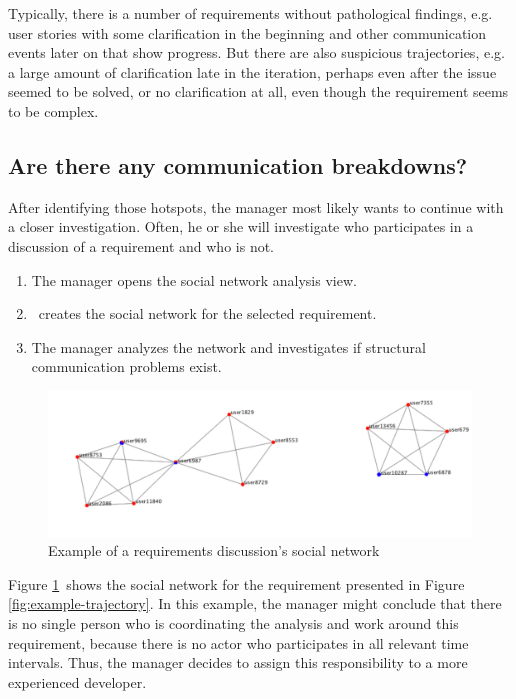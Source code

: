 Typically, there is a number of requirements without pathological findings, e.g. user stories with some clarification in the beginning and other communication events later on that show progress. 
But there are also suspicious trajectories, e.g. a large amount of clarification late in the iteration, perhaps even after the issue seemed to be solved, or no clarification at all, even though the requirement seems to be complex.

\subsection{Are there any communication breakdowns?}
After identifying those hotspots, the manager most likely wants to continue with a closer investigation. 
Often, he or she will investigate who participates in a discussion of a requirement and who is not.
\begin{enumerate}
\item The manager opens the social network analysis view.
\item \viss\ creates the social network for the selected requirement.
\item The manager analyzes the network and investigates if structural communication problems exist.
\end{enumerate}

\begin{figure}
\includegraphics[width=\columnwidth]{img/example-sn}
\caption{Example of a requirements discussion's social network}
\label{fig:example-sn}
\end{figure}

Figure \ref{fig:example-sn}\ shows the social network for the requirement presented in Figure \ref{fig:example-trajectory}. 
In this example, the manager might conclude that there is no single person who is coordinating the analysis and work around this requirement, because there is no actor who participates in all relevant time intervals.
Thus, the manager decides to assign this responsibility to a more experienced developer.

